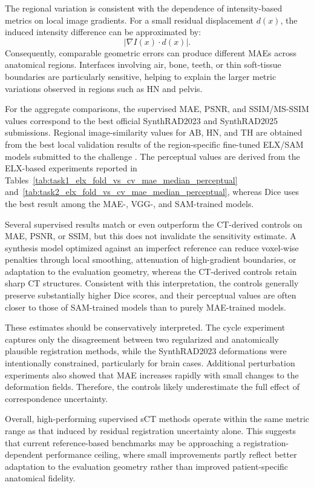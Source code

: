 \documentclass[lettersize,journal]{IEEEtran}
\begin{document}
The regional variation is consistent with the dependence of intensity-based metrics on local image gradients. For a small residual
displacement $d(x)$, the induced intensity difference can be approximated by:
\begin{equation}
    \left|\nabla I(x)\cdot d(x)\right|.
\end{equation}
Consequently, comparable geometric errors can produce different MAEs across anatomical regions. Interfaces involving air, bone, teeth, or thin soft-tissue boundaries are particularly sensitive, helping to explain the larger metric variations observed in regions such as HN and pelvis.

For the aggregate comparisons, the supervised MAE, PSNR, and SSIM/MS-SSIM values correspond to the best official SynthRAD2023 and
SynthRAD2025 submissions. Regional image-similarity values for AB, HN, and TH are obtained from the best local validation results of the region-specific fine-tuned ELX/SAM models submitted to the challenge \cite{boussot2025registration}. The perceptual values are derived from the ELX-based experiments reported in Tables~\ref{tab:task1_elx_fold_vs_cv_mae_median_perceptual} and~\ref{tab:task2_elx_fold_vs_cv_mae_median_perceptual}, whereas Dice
uses the best result among the MAE-, VGG-, and SAM-trained models.

Several supervised results match or even outperform the CT-derived controls on MAE, PSNR, or SSIM, but this does not invalidate the sensitivity estimate. A synthesis model optimized against an imperfect reference can reduce voxel-wise penalties through local smoothing, attenuation of high-gradient boundaries, or adaptation to the evaluation geometry, whereas the CT-derived controls retain sharp CT structures. Consistent with this interpretation, the controls generally preserve substantially higher Dice scores, and their perceptual values are often closer to those of SAM-trained models than to purely MAE-trained models.

These estimates should be conservatively interpreted. The cycle experiment captures only the disagreement between two regularized and anatomically plausible registration methods, while the SynthRAD2023 deformations were intentionally constrained, particularly for brain cases. Additional perturbation experiments also showed that MAE increases rapidly with small changes to the deformation fields. Therefore, the controls likely underestimate the full effect of correspondence uncertainty.

Overall, high-performing supervised sCT methods operate within the same metric range as that induced by residual registration uncertainty alone. This suggests that current reference-based benchmarks may be approaching a registration-dependent performance ceiling, where small improvements partly reflect better adaptation to the evaluation geometry rather than improved patient-specific anatomical fidelity.
\end{document}
